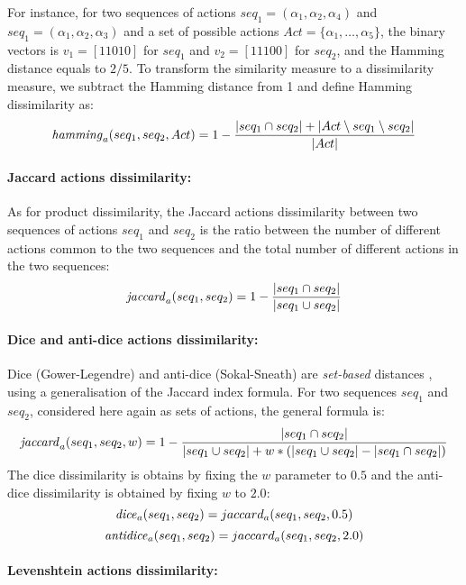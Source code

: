 For instance, for two sequences of actions $seq_1=(\alpha_1, \alpha_2, \alpha_4)$ and $seq_1=(\alpha_1, \alpha_2, \alpha_3)$ and a set of possible actions $Act=\{\alpha_1, \ldots, \alpha_5\}$, the binary vectors is $v_1=[11010]$ for $seq_1$ and $v_2=[11100]$ for $seq_2$, and the Hamming distance equals to $2/5$. To transform the similarity measure to a dissimilarity measure, we subtract the Hamming distance from 1 and define Hamming dissimilarity as:
$$ \mathit{hamming}_a(seq_1, seq_2, Act) = 1 - \frac{\vert seq_1 \cap seq_2 \vert +  \vert Act \setminus seq_1 \setminus seq_2 \vert}{\vert Act \vert} $$

\paragraph{Jaccard actions dissimilarity:}

As for product dissimilarity, the Jaccard actions dissimilarity between two sequences of actions $seq_1$ and $seq_2$ is the ratio between the number of different actions common to the two sequences and the total number of different actions in the two sequences:
$$\mathit{jaccard}_a(seq_1, seq_2) = 1 - \frac{\vert seq_1 \cap seq_2 \vert}{\vert seq_1 \cup seq_2 \vert}$$

\paragraph{Dice and anti-dice actions dissimilarity:}

Dice (Gower-Legendre) and anti-dice (Sokal-Sneath) are \emph{set-based} distances \cite{Hemmati2010,Hemmati2013}, using a generalisation of the Jaccard index formula. For two sequences $seq_1$ and $seq_2$, considered here again as sets of actions, the general formula is:
$$ \mathit{jaccard}_a(seq_1, seq_2, w) = 1 - \frac{\vert seq_1 \cap seq_2 \vert}{\vert seq_1 \cup seq_2 \vert + w * (\vert seq_1 \cup seq_2 \vert - \vert seq_1 \cap seq_2 \vert)}$$
The dice dissimilarity is obtains by fixing the $w$ parameter to $0.5$ and the anti-dice dissimilarity is obtained by fixing $w$ to $2.0$:
$$\mathit{dice}_a(seq_1, seq_2)  = jaccard_a(seq_1, seq_2, 0.5) $$
$$\mathit{antidice}_a(seq_1, seq_2)  = jaccard_a(seq_1, seq_2, 2.0) $$

\paragraph{Levenshtein actions dissimilarity:}

